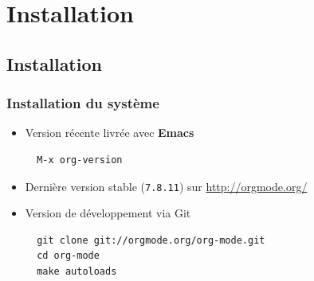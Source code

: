 \documentclass[presentation,t,hideothersubsections]{beamer}
\begin{document}
\section{Installation}
\label{sec-6}
\subsection{Installation}
\label{sec-6-1}
\begin{frame}[fragile]
\frametitle{Installation du système}
\label{sec-6-1-1}


\begin{itemize}
\item Version récente livrée avec \textbf{Emacs}


\lstset{language=Lisp}
\begin{lstlisting}
  M-x org-version
\end{lstlisting}
\item Dernière version stable (\verb~7.8.11~) sur \href{http://orgmode.org/}{http://orgmode.org/}
\item Version de développement via Git


\lstset{language=sh}
\begin{lstlisting}
  git clone git://orgmode.org/org-mode.git
  cd org-mode
  make autoloads
\end{lstlisting}
\end{itemize}
\end{frame}
\end{document}
